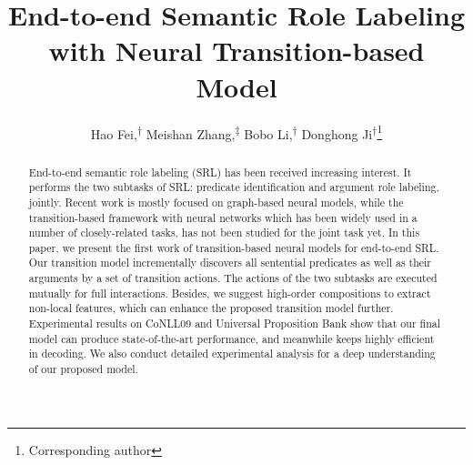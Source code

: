 \documentclass[letterpaper]{article} %
\begin{document}
\begin{CJK}{UTF8}{gbsn}



\title{End-to-end Semantic Role Labeling with Neural Transition-based Model}





\author{Hao Fei,\textsuperscript{\rm $\dag$} Meishan Zhang,\textsuperscript{\rm $\ddag$} Bobo Li,\textsuperscript{\rm $\dag$} Donghong Ji\textsuperscript{\rm $\dag$}\thanks{Corresponding author}\\
}




\maketitle
\begin{abstract}
End-to-end semantic role labeling (SRL) has been received increasing interest.
It performs the two subtasks of SRL: predicate identification and argument role labeling, jointly.
Recent work is mostly focused on graph-based neural models,
while the transition-based framework with neural networks which has been widely used in a number of closely-related tasks,
has not been studied for the joint task yet.
In this paper, we present the first work of transition-based neural models for end-to-end SRL.
Our transition model incrementally discovers all sentential predicates as well as their arguments by a set of transition actions.
The actions of the two subtasks are executed mutually for full interactions.
Besides, we suggest high-order compositions to extract non-local features, which can enhance the proposed transition model further.
Experimental results on CoNLL09 and Universal Proposition Bank show that our final model can produce state-of-the-art performance,
and meanwhile keeps highly efficient in decoding.
We also conduct detailed experimental analysis for a deep understanding of our proposed model.
\end{abstract}















\end{CJK}
\end{document}
